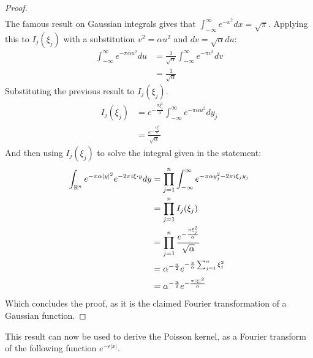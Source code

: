 \begin{proof}
\begin{gather*}
    \end{gather*}
    The famous result on Gaussian integrals gives that $\int_{-\infty}^\infty e^{-x^2}dx=\sqrt{\pi}$. Applying this to $I_j(\xi_j)$ with a substitution $v^2=\alpha u^2$ and $dv=\sqrt{\alpha}du$:
    \begin{align*}
        \int_{-\infty}^\infty e^{-\pi\alpha u^2}du&=\frac{1}{\sqrt{\alpha}}\int_{-\infty}^\infty e^{-\pi v^2}dv \\
        &=\frac{1}{\sqrt{\alpha}}
    \end{align*}
    Substituting the previous result to $I_j(\xi_j)$.
    \begin{align*}
        I_j(\xi_j)&=e^{-\frac{\pi \xi_j^2}{\alpha}}\int_{-\infty}^\infty e^{-\pi\alpha u^2}dy_j \\
        &=\frac{e^{-\frac{\pi \xi_j^2}{\alpha}}}{\sqrt{\alpha}}
    \end{align*}
    And then using $I_j(\xi_j)$ to solve the integral given in the statement:
    \begin{align*}
        \int_{\mathbb R^n}e^{-\pi\alpha|y|^2}e^{-2\pi i\xi\cdot y}dy&=\prod_{j=1}^n\int_{-\infty}^\infty e^{-\pi\alpha y_j^2-2\pi i\xi_jy_j} \\
        &=\prod_{j=1}^n I_j(\xi_j) \\
        &=\prod_{j=1}^n\frac{e^{-\frac{\pi \xi_j^2}{\alpha}}}{\sqrt{\alpha}} \\
        &=\alpha^{-\frac{n}{2}}e^{-\frac{\pi}{\alpha}\sum_{j=1}^n\xi_j^2} \\
        &=\alpha^{-\frac{n}{2}}e^{-\frac{\pi|\xi|^2}{\alpha}}
    \end{align*}
    Which concludes the proof, as it is the claimed Fourier transformation of a Gaussian function.
\end{proof}

This result can now be used to derive the Poisson kernel, as a Fourier transform of the following function $e^{-\epsilon|x|}$.

